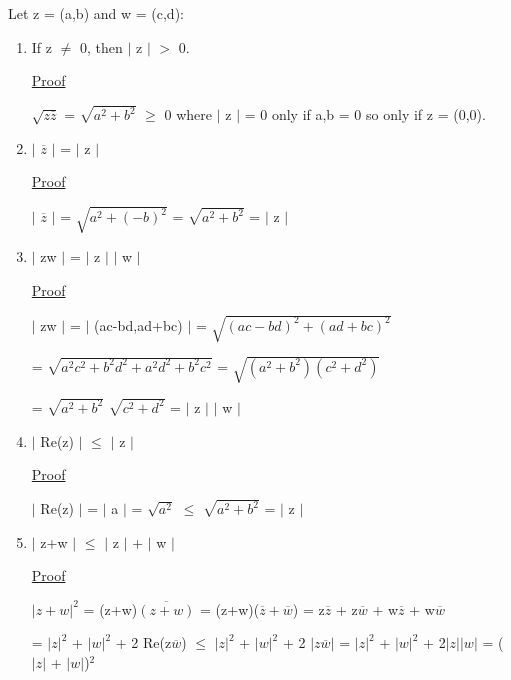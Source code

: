 	\qquad Let z = (a,b) and w = (c,d):
	\begin{enumerate}[label=(\alph*), leftmargin=2cm]
		\item If z $\neq$ 0, then $|$ z $|$ $>$ 0.

			{ \color{magenta} \underline{Proof} } 
			
				$\sqrt{z\overline{z}}$ = $\sqrt{a^2 + b^2}$ $\geq$ 0
				where $|$ z $|$ = 0 only if a,b = 0 so only if z = (0,0).

		\item $|$ $\overline{z}$ $|$ = $|$ z  $|$

			{ \color{magenta} \underline{Proof} } 
			
				$|$ $\overline{z}$ $|$ = $\sqrt{a^2 + (-b)^2}$ = $\sqrt{a^2 + b^2}$ = $|$ z $|$

		\item $|$ zw $|$ = $|$ z $|$ $|$ w $|$

			{ \color{magenta} \underline{Proof} } 
			
				$|$ zw $|$ = $|$ (ac-bd,ad+bc) $|$ = $\sqrt{(ac-bd)^2 + (ad+bc)^2}$
			
				= $\sqrt{a^2c^2 + b^2d^2 + a^2d^2 + b^2c^2}$
				= $\sqrt{(a^2+b^2)(c^2+d^2)}$

				= $\sqrt{a^2+b^2}$ $\sqrt{c^2+d^2}$ = $|$ z $|$ $|$ w $|$

		\item $|$ Re(z) $|$ $\leq$ $|$ z $|$

			{ \color{magenta} \underline{Proof} } 
			
				$|$ Re(z) $|$ = $|$ a $|$ = $\sqrt{a^2}$ $\leq$ $\sqrt{a^2+b^2}$ = $|$ z $|$

		\item $|$ z+w $|$ $ \leq $  $|$ z $|$ + $|$ w $|$

			{ \color{magenta} \underline{Proof} } 
			
				$| z+w |^2$ = (z+w)$\overline{(z+w)}$ = (z+w)($\overline{z} + \overline{w}$)
				= z$\overline{z}$ + z$\overline{w}$ + w$\overline{z}$ + w$\overline{w}$
			
				= $|z|^2$ + $|w|^2$ + 2 Re(z$\overline{w}$)
				$\leq$ $|z|^2$ + $|w|^2$ + 2 $|z\overline{w}|$
				= $|z|^2$ + $|w|^2$ + 2$|z||w|$
				= ($|z|$ + $|w|$)$^2$
	\end{enumerate}


